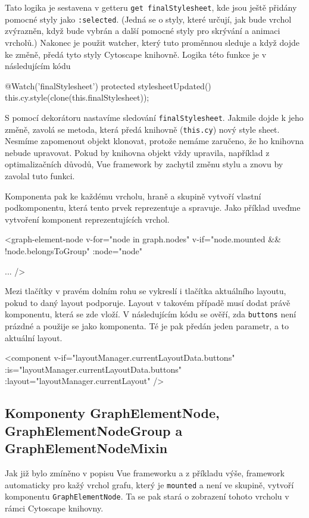 Tato logika je sestavena v getteru \texttt{get finalStylesheet}, kde jsou ještě přidány pomocné styly jako \texttt{:selected}. (Jedná se o styly, které určují, jak bude vrchol zvýrazněn, když bude vybrán a další pomocné styly pro skrývání a animaci vrcholů.) Nakonec je použit watcher, který tuto proměnnou sleduje a když dojde ke změně, předá tyto styly Cytoscape knihovně. Logika této funkce je v následujícím kódu
\begin{code}
@Watch('finalStylesheet')
protected stylesheetUpdated() {
    this.cy.style(clone(this.finalStylesheet));
}
\end{code}
S pomocí dekorátoru nastavíme sledování \texttt{finalStylesheet}. Jakmile dojde k jeho změně, zavolá se metoda, která předá knihovně (\texttt{this.cy}) nový style sheet. Nesmíme zapomenout objekt klonovat, protože nemáme zaručeno, že ho knihovna nebude upravovat. Pokud by knihovna objekt vždy upravila, například z optimalizačních důvodů, Vue framework by zachytil změnu stylu a znovu by zavolal tuto funkci.

\newpage
Komponenta pak ke každému vrcholu, hraně a skupině vytvoří vlastní podkomponentu, která tento prvek reprezentuje a spravuje. Jako příklad uveďme vytvoření komponent reprezentujících vrchol.

\begin{code}
<graph-element-node
  v-for="node in graph.nodes"
  v-if="node.mounted && !node.belongsToGroup"
  :node="node"

  ...
/>
\end{code}

\bigskip

Mezi tlačítky v pravém dolním rohu se vykreslí i tlačítka aktuálního layoutu, pokud to daný layout podporuje. Layout v takovém případě musí dodat právě komponentu, která se zde vloží. V následujícím kódu se ověří, zda \texttt{buttons} není prázdné a použije se jako komponenta. Té je pak předán jeden parametr, a to aktuální layout.

\begin{code}
<component
  v-if="layoutManager.currentLayoutData.buttons"
  :is="layoutManager.currentLayoutData.buttons"
  :layout="layoutManager.currentLayout" />
\end{code}

\subsection{Komponenty GraphElementNode, GraphElementNodeGroup a GraphElementNodeMixin}
Jak již bylo zmíněno v popisu Vue frameworku a z příkladu výše, framework automaticky pro kažý vrchol grafu, který je \texttt{mounted} a není ve skupině, vytvoří komponentu \texttt{GraphElementNode}. Ta se pak stará o zobrazení tohoto vrcholu v rámci Cytoscape knihovny.

